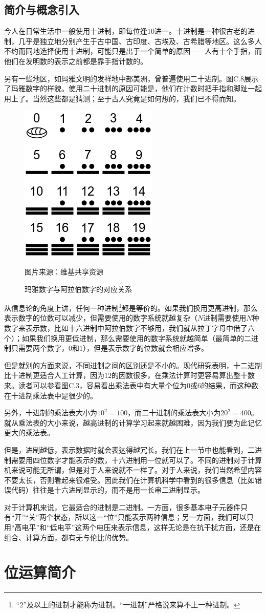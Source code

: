 \subsection*{简介与概念引入}
今人在日常生活中一般使用十进制，即每位逢10进一。十进制是一种很古老的进制，几乎是独立地分别产生于古中国、古印度、古埃及、古希腊等地区。这么多人不约而同地选择使用十进制，可能只是出于一个简单的原因——人有十个手指，而他们在发明数的表示之前都是靠手指计数的。\par
另有一些地区，如玛雅文明的发祥地中部美洲，曾普遍使用二十进制。图C.8展示了玛雅数字的样貌。使用二十进制的原因可能是，他们在计数时把手指和脚趾一起用上了。当然这些都是猜测；至于古人究竟是如何想的，我们已不得而知。\par
\begin{figure}[htbp]
    \centering
    \includegraphics[width=.3\textwidth]{../images/other_parts/C_maya_numbers.png}
    \caption{玛雅数字与阿拉伯数字的对应关系}
    \footnotesize{图片来源：维基共享资源}
\end{figure}
从信息论的角度上讲，任何一种进制\footnote{``2''及以上的进制才能称为进制。``一进制''严格说来算不上一种进制。}都是等价的。如果我们换用更高进制，那么表示数字的位数可以减少，但需要使用的数字系统就越复杂（$N$进制需要使用$N$种数字来表示数，比如十六进制中阿拉伯数字不够用，我们就从拉丁字母中借了六个）；如果我们换用更低进制，那么需要使用的数字系统就越简单（最简单的二进制只需要两个数字，$0$和$1$），但是表示数字的位数就会相应增多。\par
但是就别的方面来说，不同进制之间的区别还是不小的。现代研究表明，十二进制比十进制更适合人工计算，因为$12$的因数很多，在乘法计算时更容易算出整十数来。读者可以参看图C.3，容易看出乘法表中有大量个位为$0$或$6$的结果，而这种数在十进制乘法表中是很少的。\par
另外，十进制的乘法表大小为$10^2=100$，而二十进制的乘法表大小为$20^2=400$。就从乘法表的大小来说，越高进制的计算学习起来就越困难，因为我们要为此记忆更大的乘法表。\par
但是，进制越低，表示数据时就会表达得越冗长。我们在上一节中也能看到，二进制需要用四位数字才能表示的数，十六进制用一位就可以了。不同的进制对于计算机来说可能无所谓，但是对于人来说就不一样了。对于人来说，我们当然希望内容不要太长，否则看起来很难受。因此我们在计算机科学中看到的很多信息（比如错误代码）往往是十六进制显示的，而不是用一长串二进制显示。\par
对于计算机来说，它最适合的进制是二进制。一方面，很多基本电子元器件只有``开''``关''两个状态，所以这一``位''只能表示两种信息；另一方面，我们可以只用``高电平''和``低电平''这两个电压来表示信息，这样无论是在抗干扰方面，还是在组合、计算方面，都有无与伦比的优势。\par



\section{位运算简介}
